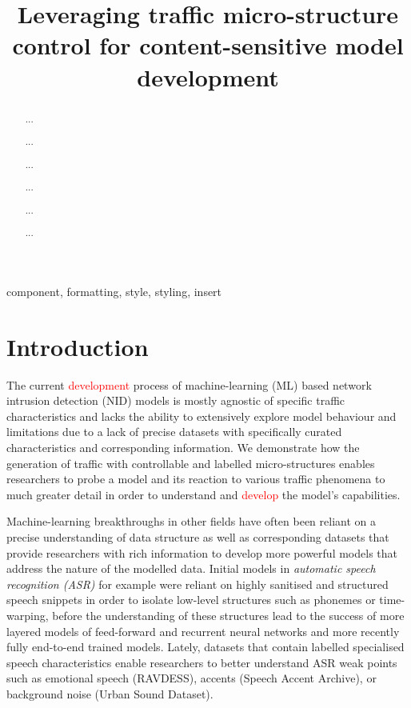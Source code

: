 \documentclass[conference]{IEEEtran}
\begin{document}
 

\title{Leveraging traffic micro-structure control for content-sensitive model development}

\maketitle

\begin{abstract}
...

...


...


...

...

...

\end{abstract}


\begin{IEEEkeywords}
component, formatting, style, styling, insert
\end{IEEEkeywords} 	



\section{Introduction}

The current \textcolor{red}{development} process of machine-learning (ML) based network intrusion detection (NID) models is mostly agnostic of specific traffic characteristics and lacks the ability to extensively explore model behaviour and limitations due to a lack of precise datasets with specifically curated characteristics and corresponding information. We demonstrate how the generation of traffic with controllable and labelled micro-structures enables researchers to probe a model and its reaction to various traffic phenomena to much greater detail in order to understand and \textcolor{red}{develop} the model's capabilities.

Machine-learning breakthroughs in other fields have often been reliant on a precise understanding of data structure as well as corresponding datasets that provide researchers with rich information to develop more powerful models that address the nature of the modelled data.
Initial models in \textit{automatic speech recognition (ASR)} for example were reliant on highly sanitised and structured speech snippets in order to isolate low-level structures such as phonemes or time-warping, before the understanding of these structures lead to the success of more layered models of feed-forward and recurrent neural networks and more recently fully end-to-end trained models. Lately, datasets that contain labelled specialised speech characteristics enable researchers to better understand ASR weak points such as emotional speech (RAVDESS), accents (Speech Accent Archive), or background noise (Urban Sound Dataset).
\end{document}
